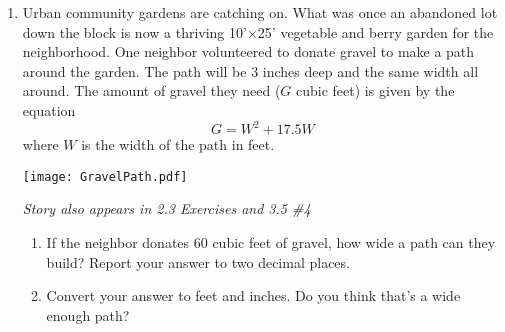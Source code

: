 \begin{enumerate}
\item Urban community gardens are catching on.  What was once an abandoned lot down the block is now a thriving 10'$\times$25' vegetable and berry garden for the neighborhood. One neighbor volunteered to donate gravel to make a path around the garden.  The path will be 3 inches deep and the same width all around.   The amount of gravel they need ($G$ cubic feet) is given by the equation  $$G = W^2 + 17.5W$$
where $W$ is the width of the path in feet.  
\begin{center}
\scalebox {.4} {\texttt{[image: GravelPath.pdf]}}
\end{center}
 \hfill \emph{Story also appears in 2.3 Exercises and 3.5 \#4}
\begin{enumerate}
\item  If the neighbor donates 60 cubic feet of gravel, how wide a path can they build?  Report your answer to two decimal places. 
\item Convert your answer to feet and inches.  Do you think that's a wide enough path? 
\end{enumerate}

\end{enumerate}
